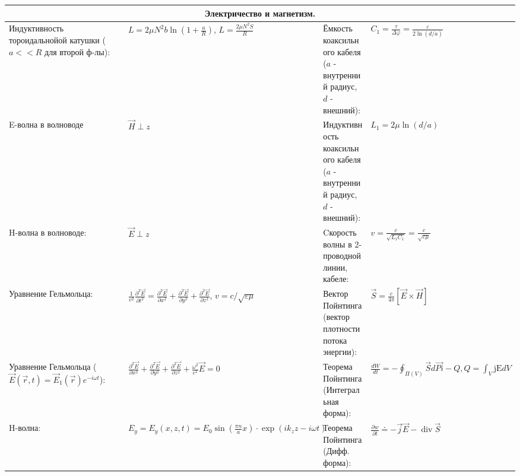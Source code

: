 \documentclass{article}
\begin{document}
\begin{tabular}{ |p{5cm}|p{4.5cm}|p{6cm}|p{3.5cm}|  }
\hline
\multicolumn{4}{|c|}{Электричество и магнетизм.} \\
\hline
Индуктивность тороидальнойой катушки ($a << R$ для второй ф-лы):           &
$L=2 \mu N^{2} b \ln \left(1+\frac{a}{R}\right)$,
$L=\frac{2 \mu N^{2} S}{R}$                                                &
Ёмкость коаксильного кабеля ($a$ - внутренний радиус, $d$ - внешний):      &
$C_{1}=\frac{\tau}{\Delta \varphi}=\frac{\varepsilon}{2 \ln (d / a)}$      \\
\hline
E-волна в волноводе                                                        &
$\vec{H} \perp z$                                                          &
Индуктивность коаксильного кабеля ($a$ - внутренний радиус, $d$ - внешний):&
$L_{1}=2 \mu \ln (d / a)$                                                  \\
\hline
H-волна в волноводе:                                                       &
$\vec{E} \perp z$                                                          &
Cкорость волны в 2-проводной линии, кабеле:                                &
$v=\frac{c}{\sqrt{L_{1} C_{1}}}=\frac{c}{\sqrt{\varepsilon \mu}}$          \\
\hline
Уравнение Гельмольца:                                                      &
$\frac{1}{v^{2}} \frac{\partial^{2} \vec{E}}{\partial t^{2}}=\frac{\partial^{2} \vec{E}}{\partial x^{2}}+\frac{\partial^{2} \vec{E}}{\partial y^{2}}+\frac{\partial^{2} \vec{E}}{\partial z^{2}}$, $v=c / \sqrt{\varepsilon \mu}$&
Вектор Пойнтинга (вектор плотности потока энергии):                        &
$\vec{S}=\frac{c}{4 \pi} [\vec{E} \times \vec{H}]$                         \\
\hline
Уравнение Гельмольца ($\vec{E}(\vec{r}, t)=\vec{E}_{1}(\vec{r}) e^{-i \omega t}$):&
$\frac{\partial^{2} \vec{E}}{\partial x^{2}}+\frac{\partial^{2} \vec{E}}{\partial y^{2}}+\frac{\partial^{2} \vec{E}}{\partial z^{2}}+\frac{\omega^{2}}{c^{2}} \vec{E}=0$&
Теорема Пойнтинга (Интегральная форма):                                    &
$\frac{d W}{d t}=-\oint_{\Pi(V)} \vec{S} d \vec{Pi}-Q, Q=\int_{V} \mathrm{jE} d V$\\
\hline
H-волна:                                                                   &
$E_{y}=E_{y}(x, z, t)=E_{0} \sin \left(\frac{\pi n}{a} x\right) \cdot \exp \left(i k_{z} z-i \omega t\right)$&
Теорема Пойнтинга (Дифф. форма):                                           &
$\frac{\partial w}{\partial t} \doteq-\vec{j} \vec{E}-\operatorname{div} \vec{S}$\\

\end{tabular}
\end{document}
